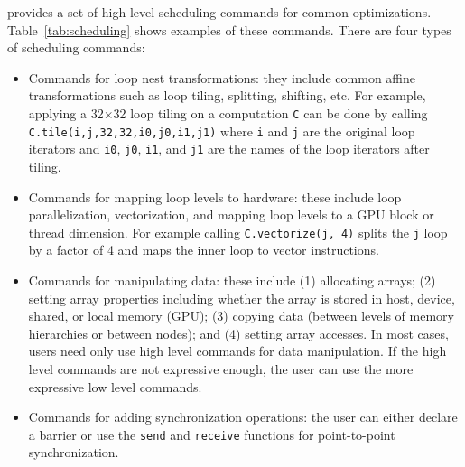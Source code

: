 \framework provides a set of high-level scheduling commands for common optimizations. Table~\ref{tab:scheduling} shows examples of these commands.  There are four types of scheduling commands:
\begin{itemize}
    \item Commands for loop nest transformations: they include common affine transformations such as loop tiling, splitting, shifting, etc.  For example, applying a 32$\times$32 loop tiling on a computation \texttt{C} can be done by calling\\ \texttt{C.tile(i,j,32,32,i0,j0,i1,j1)} where \texttt{i} and \texttt{j} are the original loop iterators and \texttt{i0}, \texttt{j0}, \texttt{i1}, and \texttt{j1} are the names of the loop iterators after tiling.

    \item Commands for mapping loop levels to hardware: these include loop parallelization, vectorization, and mapping loop levels to a GPU block or thread dimension. For example calling \texttt{C.vectorize(j, 4)} splits the \texttt{j} loop by a factor of 4 and maps the inner loop to vector  instructions.

    \item Commands for manipulating data: these include (1) allocating arrays; (2) setting array properties including whether the array is stored in host, device, shared, or local memory (GPU); (3) copying data (between levels of memory hierarchies or between nodes);  and (4) setting array accesses. In most cases, users need only use high level commands for data manipulation. If the high level commands are not expressive enough, the user can use the more expressive low level commands.

    \item Commands for adding synchronization operations: the user can either declare a barrier or use the \texttt{send} and \texttt{receive} functions for point-to-point synchronization.
\end{itemize}

